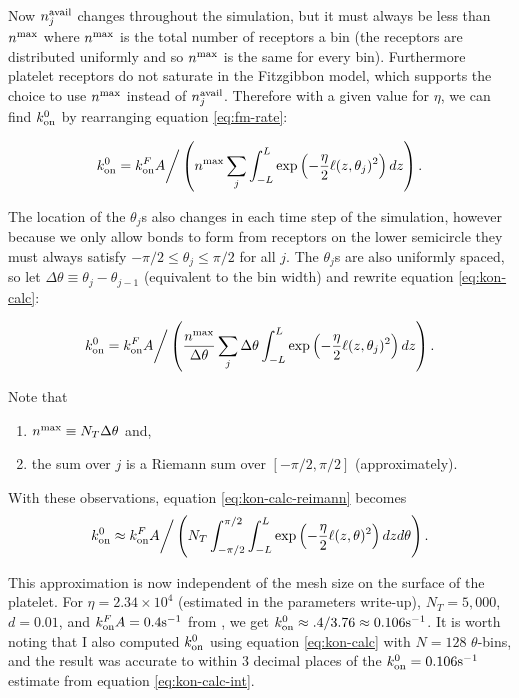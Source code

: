 \documentclass{article}
\newcommand{\tn}{\textnormal}
\begin{document}
Now $n_j^\tn{avail}$ changes throughout the simulation, but it must
always be less than $n^\tn{max}$ where $n^\tn{max}$ is the total
number of receptors a bin (the receptors are distributed uniformly and
so $n^\tn{max}$ is the same for every bin). Furthermore platelet
receptors do not saturate in the Fitzgibbon model, which supports the
choice to use $n^\tn{max}$ instead of $n_j^\tn{avail}$. Therefore with
a given value for $\eta$, we can find $k_\text{on}^0$ by rearranging
equation \eqref{eq:fm-rate}:

\begin{equation}
  \label{eq:kon-calc}
  \onConst = k_\tn{on}^F A \bigg/ \left( n^\tn{max} \sum_j \int_{-L}^{L}
    \exp \left(-\frac{\eta}{2} \ell(z, \theta_j)^2 \right) dz \right).
\end{equation}

The location of the $\theta_j$s also changes in each time step of the
simulation, however because we only allow bonds to form from receptors
on the lower semicircle they must always satisfy $-\pi/2 \le \theta_j
\le \pi/2$ for all $j$. The $\theta_j$s are also uniformly spaced, so
let $\Delta \theta \equiv \theta_j - \theta_{j-1}$ (equivalent to the
bin width) and rewrite equation \eqref{eq:kon-calc}:

\begin{equation}
  \label{eq:kon-calc-reimann}
  \onConst = k_\tn{on}^F A \bigg/ \left(\frac{n^\tn{max}}{\Delta
      \theta} \sum_j \Delta \theta \int_{-L}^{L}
    \exp\left(-\frac{\eta}{2} \ell(z, \theta_j)^2 \right) dz \right).
\end{equation}

Note that
\begin{enumerate}
\item $n^\tn{max} \equiv N_T \Delta \theta$ and,
\item the sum over $j$ is a Riemann sum over $[-\pi/2, \pi/2]$
  (approximately). 
\end{enumerate}
With these observations, equation \eqref{eq:kon-calc-reimann} becomes
\begin{equation}
  \label{eq:kon-calc-int}
  \onConst \approx k_\tn{on}^F A \bigg/ \left(N_T
    \int_{-\pi/2}^{\pi/2} \int_{-L}^{L} \exp \left(-\frac{\eta}{2}
      \ell(z, \theta)^2 \right) dz d\theta \right).
\end{equation}

This approximation is now independent of the mesh size on the surface
of the platelet. For $\eta = 2.34 \times 10^4$ (estimated in the
parameters write-up), $N_T = 5,000$, $d = 0.01$, and $k_\tn{on}^F A =
0.4 \tn{s}^{-1}$ from \cite{Fitzgibbon2014}, we get $\onConst \approx .4/3.76
\approx 0.106 \tn{s}^{-1}$. It is worth noting that I also computed
$k_\text{on}^0$ using equation \eqref{eq:kon-calc} with $N=128$
$\theta$-bins, and the result was accurate to within 3 decimal places
of the $\onConst = 0.106 \tn{s}^{-1}$ estimate from equation
\eqref{eq:kon-calc-int}.
\end{document}
